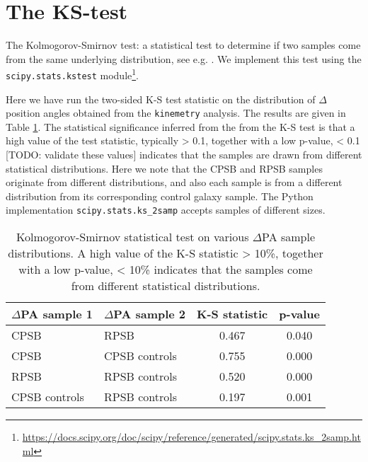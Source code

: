 \section{The KS-test}
The Kolmogorov-Smirnov test: a statistical test to determine if two samples come from the same underlying distribution, see e.g. \citet{hodges1958significance}. We implement this test using the \texttt{scipy.stats.kstest} module\footnote{\href{}{https://docs.scipy.org/doc/scipy/reference/generated/scipy.stats.ks\_2samp.html}}.

Here we have run the two-sided K-S test statistic on the distribution of $\Delta$ position angles obtained from the \texttt{kinemetry} analysis. The results are given in Table \ref{tab:K-S-tests}. The statistical significance inferred from the from the K-S test is that a high value of the test statistic, typically > 0.1, together with a low p-value, < 0.1 [TODO: validate these values] indicates that the samples are drawn from different statistical distributions. Here we note that the CPSB and RPSB samples originate from different distributions, and also each sample is from a different distribution from its corresponding control galaxy sample. The Python implementation \texttt{scipy.stats.ks\_2samp} accepts samples of different sizes.

\begin{table}
\caption{Kolmogorov-Smirnov statistical test on various $\Delta$PA sample distributions. A high value of the K-S statistic > 10\%, together with a low p-value, < 10\% indicates that the samples come from different statistical distributions.}
\label{tab:K-S-tests}
\begin{tabular}{llcc}
\hline
$\Delta$PA sample 1  & $\Delta$PA sample 2 & K-S statistic & p-value \\
\hline
CPSB & RPSB & 0.467 & 0.040 \\
CPSB & CPSB controls & 0.755 & 0.000 \\
RPSB & RPSB controls & 0.520 & 0.000 \\
CPSB controls & RPSB controls & 0.197 & 0.001 \\
\hline
\end{tabular}
\end{table}
